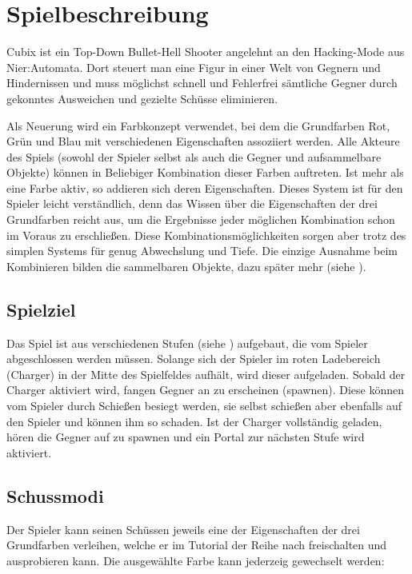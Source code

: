 
\chapter{Spielbeschreibung}

Cubix ist ein Top-Down Bullet-Hell Shooter angelehnt an den Hacking-Mode aus Nier:Automata\cite{qNierHM}.
Dort steuert man eine Figur in einer Welt von Gegnern und Hindernissen und muss möglichst schnell und Fehlerfrei sämtliche Gegner durch gekonntes Ausweichen und gezielte Schüsse eliminieren.

Als Neuerung wird ein Farbkonzept verwendet, bei dem die Grundfarben Rot, Grün und Blau mit verschiedenen Eigenschaften assoziiert werden. Alle Akteure des Spiels (sowohl der Spieler selbst als auch die Gegner und aufsammelbare Objekte) können in Beliebiger Kombination dieser Farben auftreten. Ist mehr als eine Farbe aktiv, so addieren sich deren Eigenschaften. Dieses System ist für den Spieler leicht verständlich, denn das Wissen über die Eigenschaften der drei Grundfarben reicht aus, um die Ergebnisse jeder möglichen Kombination schon im Voraus zu erschlie{\ss}en. Diese Kombinationsmöglichkeiten sorgen aber trotz des simplen Systems für genug Abwechslung und Tiefe. Die einzige Ausnahme beim Kombinieren bilden die sammelbaren Objekte, dazu später mehr (siehe ).




\section{Spielziel}

Das Spiel ist aus verschiedenen Stufen (siehe ) aufgebaut, die vom Spieler abgeschlossen werden müssen.
Solange sich der Spieler im roten Ladebereich (Charger) in der Mitte des Spielfeldes aufhält, wird dieser aufgeladen.
Sobald der Charger aktiviert wird, fangen Gegner an zu erscheinen (spawnen). Diese können vom Spieler durch Schie{\ss}en besiegt werden, sie selbst schie{\ss}en aber ebenfalls auf den Spieler und können ihm so schaden.
Ist der Charger vollständig geladen, hören die Gegner auf zu spawnen und ein Portal zur nächsten Stufe wird aktiviert.




\section{Schussmodi}

Der Spieler kann seinen Schüssen jeweils eine der Eigenschaften der drei Grundfarben verleihen, welche er im Tutorial der Reihe nach freischalten und ausprobieren kann. Die ausgewählte Farbe kann jederzeig gewechselt werden:

